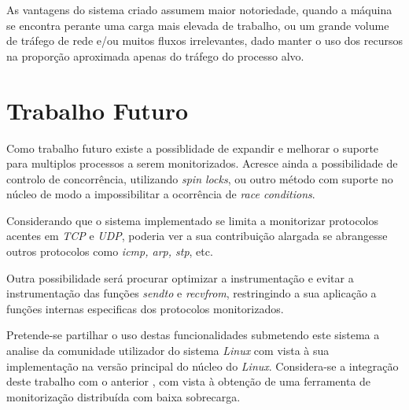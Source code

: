 As vantagens do sistema criado assumem maior notoriedade, quando a máquina se encontra perante uma carga mais elevada de trabalho, ou um grande volume de tráfego de rede e/ou muitos fluxos irrelevantes, dado manter o uso dos recursos na proporção aproximada apenas do tráfego do processo alvo.

\section{Trabalho Futuro}
\label{sec:future_work}
Como trabalho futuro existe a possiblidade de expandir e melhorar o suporte para multiplos processos a serem monitorizados.
Acresce ainda a possibilidade de controlo de concorrência, utilizando \textit{spin locks}, ou outro método com suporte no núcleo de modo a impossibilitar a ocorrência de \textit{race conditions}.

Considerando que o sistema implementado se limita a monitorizar protocolos acentes em \textit{TCP} e \textit{UDP}, poderia ver a sua contribuição alargada se abrangesse outros protocolos como \textit{icmp, arp, stp}, etc.

Outra possibilidade será procurar optimizar a instrumentação e evitar a instrumentação das funções \textit{sendto} e \textit{recvfrom}, restringindo a sua aplicação a funções internas especificas dos protocolos monitorizados.

Pretende-se partilhar o uso destas funcionalidades submetendo este sistema a analise da comunidade utilizador do sistema \textit{Linux} com vista à sua implementação na versão principal do núcleo do \textit{Linux}.
Considera-se a integração deste trabalho com o anterior \cite{duarte10,Farruca:2009}, com vista à obtenção de uma ferramenta de monitorização distribuída com baixa sobrecarga.
